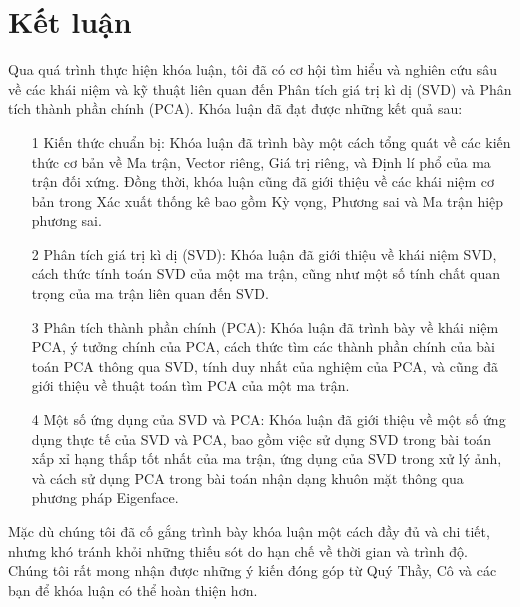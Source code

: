 \documentclass[12pt,a4paper,oneside]{report}
\numberwithin{equation}{section}
\begin{document}
\chapter*{Kết luận}
Qua quá trình thực hiện khóa luận, tôi đã có cơ hội tìm hiểu và nghiên cứu sâu về các khái niệm và kỹ thuật liên quan đến Phân tích giá trị kì dị (SVD) và Phân tích thành phần chính (PCA). Khóa luận đã đạt được những kết quả sau:
\begin{itemize}
	\item[1] Kiến thức chuẩn bị: Khóa luận đã trình bày một cách tổng quát về các kiến thức cơ bản về Ma trận, Vector riêng, Giá trị riêng, và Định lí phổ của ma trận đối xứng. Đồng thời, khóa luận cũng đã giới thiệu về các khái niệm cơ bản trong Xác xuất thống kê bao gồm Kỳ vọng, Phương sai và Ma trận hiệp phương sai.

\item[2] Phân tích giá trị kì dị (SVD): Khóa luận đã giới thiệu về khái niệm SVD, cách thức tính toán SVD của một ma trận, cũng như một số tính chất quan trọng của ma trận liên quan đến SVD.

\item[3] Phân tích thành phần chính (PCA): Khóa luận đã trình bày về khái niệm PCA, ý tưởng chính của PCA, cách thức tìm các thành phần chính của bài toán PCA thông qua SVD, tính duy nhất của nghiệm của PCA, và cũng đã giới thiệu về thuật toán tìm PCA của một ma trận.

\item[4] Một số ứng dụng của SVD và PCA: Khóa luận đã giới thiệu về một số ứng dụng thực tế của SVD và PCA, bao gồm việc sử dụng SVD trong bài toán xấp xỉ hạng thấp tốt nhất của ma trận, ứng dụng của SVD trong xử lý ảnh, và cách sử dụng PCA trong bài toán nhận dạng khuôn mặt thông qua phương pháp Eigenface.
\end{itemize}
Mặc dù chúng tôi đã cố gắng trình bày khóa luận một cách đầy đủ và chi tiết, nhưng khó tránh khỏi những thiếu sót do hạn chế về thời gian và trình độ. Chúng tôi rất mong nhận được những ý kiến đóng góp từ Quý Thầy, Cô và các bạn để khóa luận có thể hoàn thiện hơn.
\end{document}
